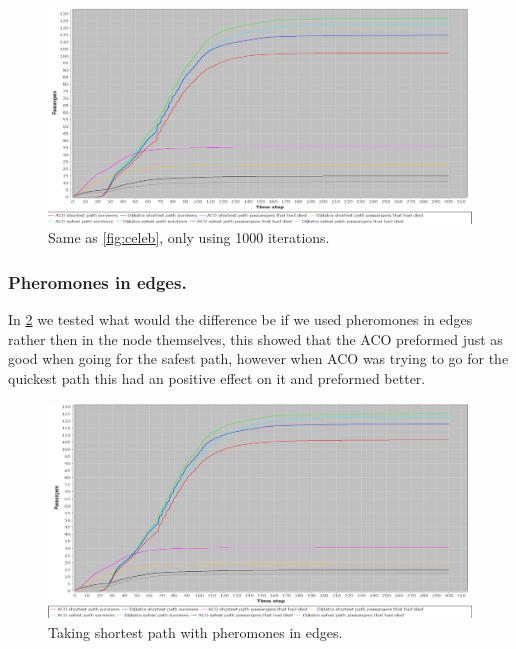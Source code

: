 \begin{figure} [h]
\centering
\hspace*{-1.0in}
\includegraphics[scale=0.35]{images/Graph-using-1000-rounds-140-passangers.png}
\caption{Same as \ref{fig:celeb}, only using 1000 iterations.}
\label{fig:celeb1000}
\end{figure}



\subsubsection{Pheromones in edges.}
In \ref{fig:celebPherInEdge} we tested what would the difference be if we used pheromones in edges rather then in the node themselves, this showed that the ACO preformed just as good when going for the safest path, however when ACO was trying to go for the quickest path this had an positive effect on it and preformed better.

\begin{figure} [h]
\centering
\hspace*{-1.0in}
\includegraphics[scale=0.35]{images/Graph-using-200-rounds-140-passangers-and-one-hazzard-and-ACO-having-pheremons-in-edges.png}
\caption{Taking shortest path with pheromones in edges.}
\label{fig:celebPherInEdge}
\end{figure}



